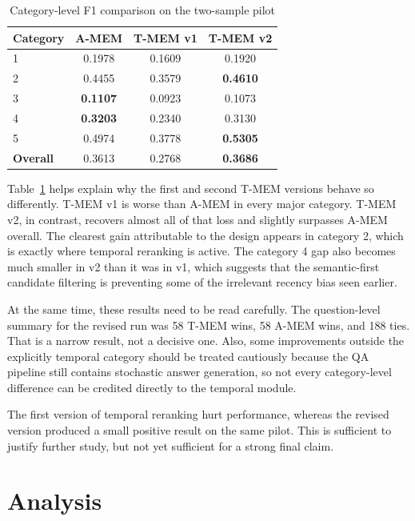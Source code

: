 \documentclass[conference]{IEEEtran}
\begin{document}
\begin{table}[htbp]
\caption{Category-level F1 comparison on the two-sample pilot}
\label{tab:categoryf1}
\centering
\small
\begin{tabular}{lccc}
\toprule
\textbf{Category} & \textbf{A-MEM} & \textbf{T-MEM v1} & \textbf{T-MEM v2} \\
\midrule
1 & 0.1978 & 0.1609 & 0.1920 \\
2 & 0.4455 & 0.3579 & \textbf{0.4610} \\
3 & \textbf{0.1107} & 0.0923 & 0.1073 \\
4 & \textbf{0.3203} & 0.2340 & 0.3130 \\
5 & 0.4974 & 0.3778 & \textbf{0.5305} \\
\midrule
\textbf{Overall} & 0.3613 & 0.2768 & \textbf{0.3686} \\
\bottomrule
\end{tabular}
\end{table}

Table~\ref{tab:categoryf1} helps explain why the first and second T-MEM versions behave so differently. T-MEM v1 is worse than A-MEM in every major category. T-MEM v2, in contrast, recovers almost all of that loss and slightly surpasses A-MEM overall. The clearest gain attributable to the design appears in category 2, which is exactly where temporal reranking is active. The category 4 gap also becomes much smaller in v2 than it was in v1, which suggests that the semantic-first candidate filtering is preventing some of the irrelevant recency bias seen earlier.

At the same time, these results need to be read carefully. The question-level summary for the revised run was 58 T-MEM wins, 58 A-MEM wins, and 188 ties. That is a narrow result, not a decisive one. Also, some improvements outside the explicitly temporal category should be treated cautiously because the QA pipeline still contains stochastic answer generation, so not every category-level difference can be credited directly to the temporal module.

The first version of temporal reranking hurt performance, whereas the revised version produced a small positive result on the same pilot. This is sufficient to justify further study, but not yet sufficient for a strong final claim.

\section{Analysis}
\end{document}
